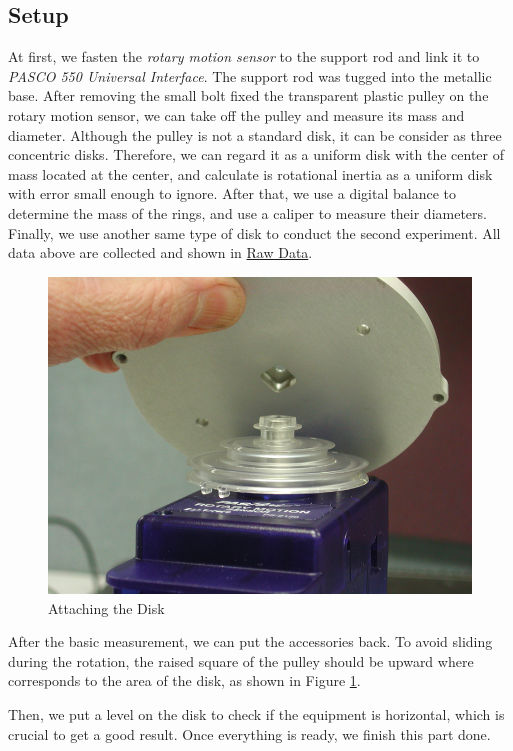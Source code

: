 \subsection{Setup}
At first, we fasten the \emph{rotary motion sensor} to the support rod and link it to \textit{PASCO 550 Universal Interface}. The support rod was tugged into the metallic base. After removing the small bolt fixed the transparent plastic pulley on the rotary motion sensor, we can take off the pulley and measure its mass and diameter. Although the pulley is not a standard disk, it can be consider as three concentric disks. Therefore, we can regard it as a uniform disk with the center of mass located at the center, and calculate is rotational inertia as a uniform disk with error small enough to ignore. After that, we use a digital balance to determine the mass of the rings, and use a caliper to measure their diameters. Finally, we use another same type of disk to conduct the second experiment. All data above are collected and shown in \hyperref[sec:raw]{Raw Data}.\par
\begin{figure}[H]
  \centering\includegraphics[width=15cm]{figSetup1.png}
  \caption{Attaching the Disk}
  \label{fig:attachDisk}
\end{figure}
After the basic measurement, we can put the accessories back. To avoid sliding during the rotation, the raised square of the pulley should be upward where corresponds to the area of the disk, as shown in Figure \ref{fig:attachDisk}.\par
Then, we put a level on the disk to check if the equipment is horizontal, which is crucial to get a good result. Once everything is ready, we finish this part done.
